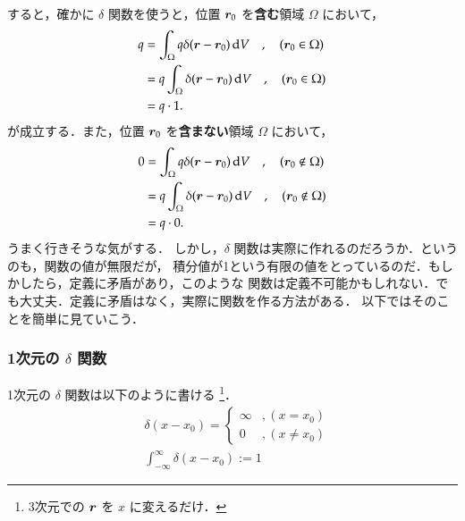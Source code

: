              すると，確かに $\delta$ 関数を使うと，位置 $\boldsymbol{r}_{0}$ を\textbf{含む}領域 $\Omega$ において，
                \begin{align*}
                        q &= \int_\Omega q\delta(\boldsymbol{r}-\boldsymbol{r}_{0})\,\mathrm{d} V \quad,\quad (\boldsymbol{r}_{0} \in \Omega) \\
                          &= q \int_\Omega \delta(\boldsymbol{r}-\boldsymbol{r}_{0})\,\mathrm{d} V \quad,\quad (\boldsymbol{r}_{0} \in \Omega) \\
                          &= q \cdot 1.
                \end{align*}
             が成立する．また，位置 $\boldsymbol{r}_{0}$ を\textbf{含まない}領域 $\Omega$ において，
                \begin{align*}
                        0 &= \int_\Omega q\delta(\boldsymbol{r}-\boldsymbol{r}_{0})\,\mathrm{d} V \quad,\quad (\boldsymbol{r}_{0} \notin \Omega) \\
                          &= q \int_\Omega \delta(\boldsymbol{r}-\boldsymbol{r}_{0})\,\mathrm{d} V \quad,\quad (\boldsymbol{r}_{0} \notin \Omega) \\
                          &= q \cdot 0.
                \end{align*}
                        うまく行きそうな気がする．
                        しかし，$\delta$ 関数は実際に作れるのだろうか．というのも，関数の値が無限だが，
            積分値が1という有限の値をとっているのだ．もしかしたら，定義に矛盾があり，このような
            関数は定義不可能かもしれない．でも大丈夫．定義に矛盾はなく，実際に関数を作る方法がある．
            以下ではそのことを簡単に見ていこう．
        \subsubsection{1次元の $\delta$ 関数}\label{subsub:delta1d_function}
                        1次元の $\delta$ 関数は以下のように書ける
                                \footnote{
                                        3次元での $\boldsymbol{r}$ を $x$ に変えるだけ．
                                }．
                        \begin{align*}
                                &\delta \left( x - x_{0} \right) =
                                \begin{cases}
                                   \infty    &, (x  =   x_{0})  \\
                                    0        &, (x \neq x_{0})
                                \end{cases} \\
                                &\int_{-\infty}^{\infty} \delta\left( x -x_{0}\right) := 1
                        \end{align*}

